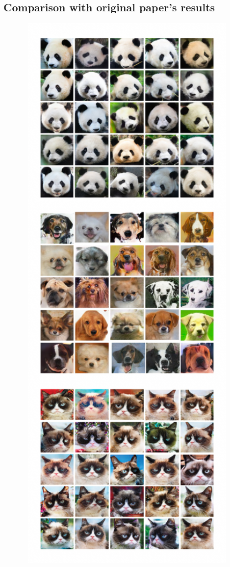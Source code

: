 \documentclass[12pt]{article}
\begin{document}
\subsection{Comparison with original paper's results}
\vspace*{-1.3cm}
\begin{center}
	\begin{minipage}[t]{0.48\textwidth} 
		\begin{figure}[H]
			\includegraphics[width=1\textwidth]{Images/comparison.jpg}

\end{figure}
\end{minipage}
\end{center}
\end{document}
